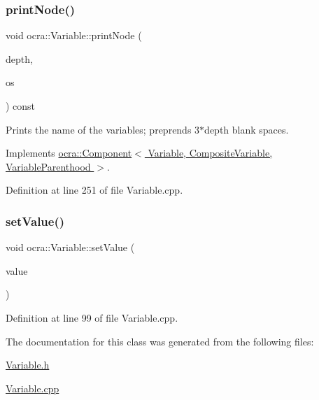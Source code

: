 \subsubsection{\texorpdfstring{print\+Node()}{printNode()}}
{\footnotesize\ttfamily void ocra\+::\+Variable\+::print\+Node (\begin{DoxyParamCaption}\item[{int}]{depth,  }\item[{std\+::ostream \&}]{os }\end{DoxyParamCaption}) const\hspace{0.3cm}{\ttfamily [virtual]}}



Prints the name of the variables; preprends 3$\ast$depth blank spaces. 



Implements \hyperlink{classocra_1_1Component_a61bb6d9557a6ba3d13f9bc083422d1a7}{ocra\+::\+Component$<$ Variable, Composite\+Variable, Variable\+Parenthood $>$}.



Definition at line 251 of file Variable.\+cpp.

\hypertarget{classocra_1_1Variable_a20990f33a83803b185f44f235d8a1be8}{}\label{classocra_1_1Variable_a20990f33a83803b185f44f235d8a1be8} 
\subsubsection{\texorpdfstring{set\+Value()}{setValue()}}
{\footnotesize\ttfamily void ocra\+::\+Variable\+::set\+Value (\begin{DoxyParamCaption}\item[{const Vector\+Xd \&}]{value }\end{DoxyParamCaption})}



Definition at line 99 of file Variable.\+cpp.



The documentation for this class was generated from the following files\+:\begin{DoxyCompactItemize}
\item 
\hyperlink{Variable_8h}{Variable.\+h}\item 
\hyperlink{Variable_8cpp}{Variable.\+cpp}\end{DoxyCompactItemize}
